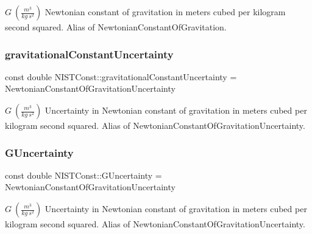 $G \ (\frac{m^3}{kg\ s^2})$ Newtonian constant of gravitation in meters cubed per kilogram second squared. Alias of Newtonian\+Constant\+Of\+Gravitation. \mbox{\label{group___n_i_s_t_const-_gravitational_constant_gae0af1dfa30856852c6c5a6936eb2354f}} 
\subsubsection{\texorpdfstring{gravitational\+Constant\+Uncertainty}{gravitationalConstantUncertainty}}
{\footnotesize\ttfamily const double N\+I\+S\+T\+Const\+::gravitational\+Constant\+Uncertainty = Newtonian\+Constant\+Of\+Gravitation\+Uncertainty}

$G \ (\frac{m^3}{kg\ s^2})$ Uncertainty in Newtonian constant of gravitation in meters cubed per kilogram second squared. Alias of Newtonian\+Constant\+Of\+Gravitation\+Uncertainty. \mbox{\label{group___n_i_s_t_const-_gravitational_constant_gaf812b3fa9a3fa9f4ea48f77e00d3b205}} 
\subsubsection{\texorpdfstring{G\+Uncertainty}{GUncertainty}}
{\footnotesize\ttfamily const double N\+I\+S\+T\+Const\+::\+G\+Uncertainty = Newtonian\+Constant\+Of\+Gravitation\+Uncertainty}

$G \ (\frac{m^3}{kg\ s^2})$ Uncertainty in Newtonian constant of gravitation in meters cubed per kilogram second squared. Alias of Newtonian\+Constant\+Of\+Gravitation\+Uncertainty. \mbox{\label{group___n_i_s_t_const-_gravitational_constant_gaba6371307f4cebde50b3c61a07c724c5}} 
